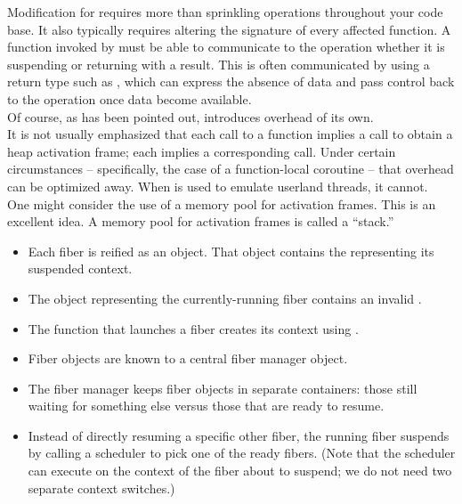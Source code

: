 Modification for \coawait requires more than sprinkling \coawait
operations throughout your code base. It also typically requires altering the
signature of every affected function. A function invoked by \coawait
must be able to communicate to the \coawait operation whether it is
suspending or returning with a result. This is often communicated by using a
return type such as , which can express the absence of data
and pass control back to the \coawait operation once data become
available.\\

Of course, as has been pointed out,\cite{N4045}  introduces
overhead of its own.\\

It is not usually emphasized that each call to a \coawait function
implies a  call to obtain a heap activation frame;
each  implies a corresponding  call. Under certain
circumstances -- specifically, the case of a function-local coroutine -- that
overhead can be optimized away. When \coawait is used to emulate
userland threads, it cannot.\\

One might consider the use of a memory pool for activation frames. This is an
excellent idea. A memory pool for activation frames is called a ``stack.''\\

\begin{itemize}
\item Each fiber is reified as an object. That object contains the
   representing its suspended context.
\item The object representing the currently-running fiber contains
  an invalid .
\item The function that launches a fiber creates its context using
  .
\item Fiber objects are known to a central fiber manager object.
\item The fiber manager keeps fiber objects in separate containers: those
  still waiting for something else versus those that are ready
  to resume.
\item Instead of directly resuming a specific other fiber, the
  running fiber suspends by calling a scheduler to pick one of the ready
  fibers. (Note that the scheduler can execute on the context of the fiber
  about to suspend; we do not need two separate context switches.)
\end{itemize}

